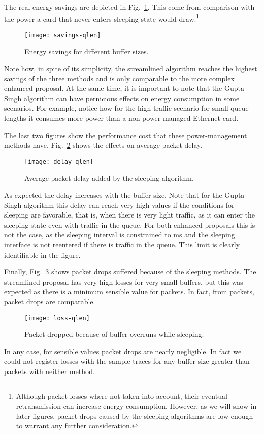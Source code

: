 \documentclass[conference,english]{IEEEtran}
\begin{document}
The real energy savings are depicted in Fig.~\ref{fig:savings}. This come from
comparison with the power a card that never enters sleeping state would
draw.\footnote{Although packet losses where not taken into account, their
  eventual retransmission can increase energy consumption. However, as we will
  show in later figures, packet drops caused by the sleeping algorithms are
  low enough to warrant any further consideration.}
\begin{figure}
  \centering
  \texttt{[image: savings-qlen]}
  \caption{Energy savings for different buffer sizes.}
  \label{fig:savings}
\end{figure}
Note how, in spite of its simplicity, the streamlined algorithm reaches the
highest savings of the three methods and is only comparable to the more
complex enhanced proposal. At the same time, it is important to note that the
Gupta-Singh algorithm can have pernicious effects on energy consumption in
some scenarios. For example, notice how for the high-traffic scenario for
small queue lengths it consumes more power than a non power-managed Ethernet
card.

The last two figures show the performance cost that these power-management
methods have. Fig.~\ref{fig:delay} shows the effects on average packet delay.
\begin{figure}
  \centering
  \texttt{[image: delay-qlen]}
  \caption{Average packet delay added by the sleeping algorithm.}
  \label{fig:delay}
\end{figure}
As expected the delay increases with the buffer size. Note that for the
Gupta-Singh algorithm this delay can reach very high values if the conditions
for sleeping are favorable, that is, when there is very light traffic, as it
can enter the sleeping state even with traffic in the queue. For both enhanced
proposals this is not the case, as the sleeping interval is constrained to
ms and the sleeping interface is not reentered if there is
traffic in the queue. This limit is clearly identifiable in the figure.

Finally, Fig.~\ref{fig:drops} shows packet drops suffered because of the
sleeping methods. The streamlined proposal has very high-losses for very small
buffers, but this was expected as there is a minimum sensible value for packets. In fact, from packets, packet drops are comparable.
\begin{figure}
  \centering
  \texttt{[image: loss-qlen]}
  \caption{Packet dropped because of buffer overruns while sleeping.}
  \label{fig:drops}
\end{figure}
In any case, for sensible  values packet drops are nearly negligible. In
fact we could not register losses with the sample traces for any buffer size
greater than packets with neither method.
\end{document}
